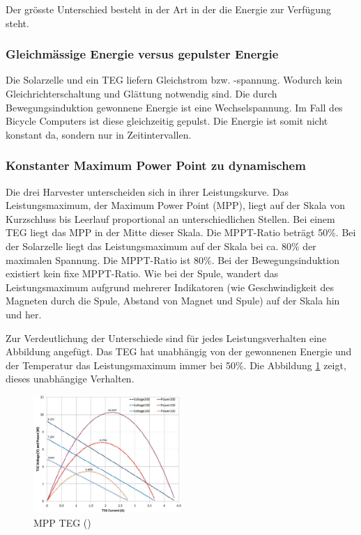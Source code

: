 Der grösste Unterschied besteht in der Art in der die Energie zur Verfügung steht. 

\subsubsection{Gleichmässige Energie versus gepulster Energie}
Die Solarzelle und ein TEG liefern Gleichstrom bzw. -spannung. Wodurch kein Gleichrichterschaltung und Glättung notwendig sind. Die durch Bewegungsinduktion gewonnene Energie ist eine Wechselspannung. Im Fall des Bicycle Computers ist diese gleichzeitig gepulst. Die Energie ist somit nicht konstant da, sondern nur in Zeitintervallen.

\subsubsection{Konstanter Maximum Power Point zu dynamischem}
Die drei Harvester unterscheiden sich in ihrer Leistungskurve. Das Leistungsmaximum, der Maximum Power Point (MPP), liegt auf der Skala von Kurzschluss bis Leerlauf proportional an unterschiedlichen Stellen.  Bei einem TEG liegt das MPP in der Mitte dieser Skala. Die MPPT-Ratio beträgt 50\thinspace\%. Bei der Solarzelle liegt das Leistungsmaximum auf der Skala bei ca. 80\thinspace\% der maximalen Spannung. Die MPPT-Ratio ist 80\thinspace\%.  Bei der Bewegungsinduktion existiert kein fixe MPPT-Ratio. Wie bei der Spule, wandert das Leistungsmaximum aufgrund mehrerer Indikatoren (wie Geschwindigkeit des Magneten durch die Spule, Abstand von Magnet und Spule) auf der Skala hin und her.

Zur Verdeutlichung der Unterschiede sind für jedes Leistungsverhalten eine Abbildung angefügt. Das TEG hat unabhängig von der gewonnenen Energie und der Temperatur das Leistungsmaximum immer bei 50\thinspace\%. Die Abbildung \ref{teg} zeigt, dieses unabhängige Verhalten. 

\begin{figure}[ht]
 \includegraphics[width=0.5\textwidth]{2TheoretischeGrundlagen/imag/MPPTEG.png}
\caption{MPP TEG (\cite{MPP_TEG})}
\label{teg} 
\end{figure}


